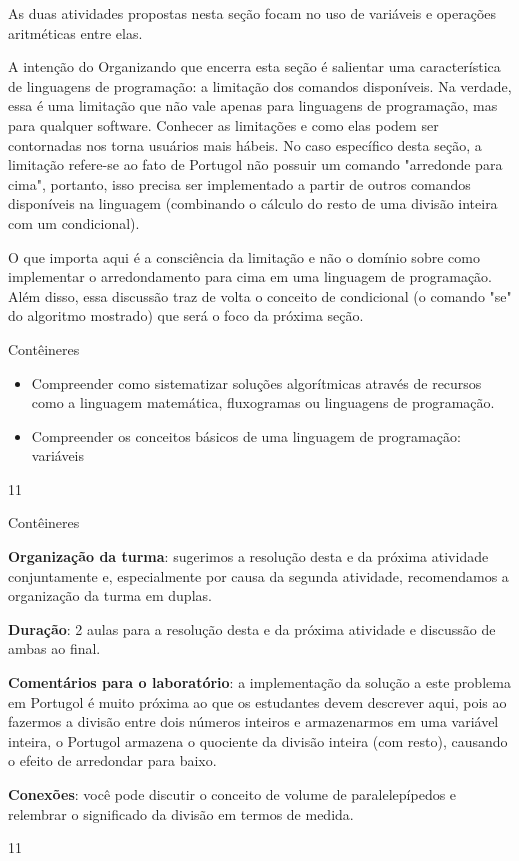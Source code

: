 \label{comp_exp3}
\begin{texto}
{
As duas atividades propostas nesta seção focam no uso de variáveis e operações aritméticas entre elas.

A intenção do Organizando que encerra esta seção é salientar uma característica de linguagens de programação: a limitação dos comandos disponíveis. Na verdade, essa é uma limitação que não vale apenas para linguagens de programação, mas para qualquer software. Conhecer as limitações e como elas podem ser contornadas nos torna usuários mais hábeis. No caso específico desta seção, a limitação refere-se ao fato de Portugol não possuir um comando "arredonde para cima", portanto, isso precisa ser implementado a partir de outros comandos disponíveis na linguagem (combinando o cálculo do resto de uma divisão inteira com um condicional).

O que importa aqui é a consciência da limitação e não o domínio sobre como implementar o arredondamento para cima em uma linguagem de programação. Além disso, essa discussão traz de volta o conceito de condicional (o comando "se"{} do algoritmo mostrado) que será o foco da próxima seção.
}
\end{texto}
\marginpar{\vspace{-1em}}
\begin{objectives}{Contêineres}
{
\begin{itemize}
\item Compreender como sistematizar soluções algorítmicas através de recursos como a linguagem matemática, fluxogramas ou linguagens de programação.

\item Compreender os conceitos básicos de uma linguagem de programação: variáveis
\end{itemize}
}{1}{1}
\end{objectives}
\marginpar{\vspace{-2.5em}}
\begin{sugestions}{Contêineres}
{
\textbf{Organização da turma}: sugerimos a resolução desta e da próxima atividade conjuntamente e, especialmente por causa da segunda atividade, recomendamos a organização da turma em duplas.

\textbf{Duração}: 2 aulas para a resolução desta e da próxima atividade e discussão de ambas ao final.

\textbf{Comentários para o laboratório}: a implementação da solução a este problema em Portugol é muito próxima ao que os estudantes devem descrever aqui, pois ao fazermos a divisão entre dois números inteiros e armazenarmos em uma variável inteira, o Portugol armazena o quociente da divisão inteira (com resto), causando o efeito de arredondar para baixo.

\textbf{Conexões}: você pode discutir o conceito de volume de paralelepípedos e relembrar o significado da divisão em termos de medida.
}{1}{1}
\end{sugestions}
